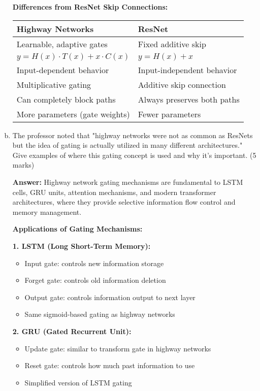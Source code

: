 \documentclass[12pt]{article}
\newcommand{\answer}[1]{{\color{answercolor}\textbf{Answer:} #1}}
\newcommand{\explanation}[1]{{\color{explanationcolor}#1}}
\begin{document}
\begin{enumerate}[(a)]
{    \textbf{Differences from ResNet Skip Connections:}
    
    \begin{tabular}{|p{5cm}|p{5cm}|}
    \hline
    \textbf{Highway Networks} & \textbf{ResNet} \\
    \hline
    Learnable, adaptive gates & Fixed additive skip \\
    $y = H(x) \cdot T(x) + x \cdot C(x)$ & $y = H(x) + x$ \\
    Input-dependent behavior & Input-independent behavior \\
    Multiplicative gating & Additive skip connection \\
    Can completely block paths & Always preserves both paths \\
    More parameters (gate weights) & Fewer parameters \\
    \hline
    \end{tabular}
    }
    
    \item The professor noted that "highway networks were not as common as ResNets but the idea of gating is actually utilized in many different architectures." Give examples of where this gating concept is used and why it's important. \hfill (5 marks)
    
    \answer{Highway network gating mechanisms are fundamental to LSTM cells, GRU units, attention mechanisms, and modern transformer architectures, where they provide selective information flow control and memory management.}
    
    \explanation{
    \textbf{Applications of Gating Mechanisms:}
    
    \textbf{1. LSTM (Long Short-Term Memory):}
    \begin{itemize}
        \item Input gate: controls new information storage
        \item Forget gate: controls old information deletion
        \item Output gate: controls information output to next layer
        \item Same sigmoid-based gating as highway networks
    \end{itemize}
    
    \textbf{2. GRU (Gated Recurrent Unit):}
    \begin{itemize}
        \item Update gate: similar to transform gate in highway networks
        \item Reset gate: controls how much past information to use
        \item Simplified version of LSTM gating
    \end{itemize}
    
}
\end{enumerate}
\end{document}
